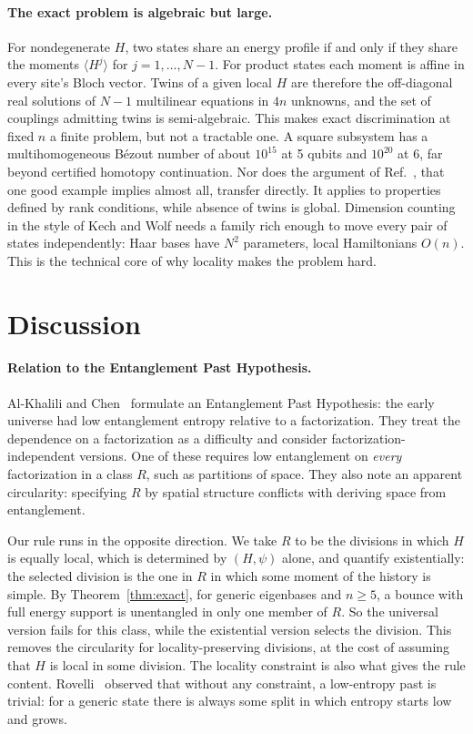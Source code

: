 \documentclass[11pt]{article}
\theoremstyle{definition}
\theoremstyle{remark}
\begin{document}
\paragraph{The exact problem is algebraic but large.} For nondegenerate $H$, two states share an energy profile if and only if they share the moments $\langle H^j\rangle$ for $j=1,\dots,N-1$. For product states each moment is affine in every site's Bloch vector. Twins of a given local $H$ are therefore the off-diagonal real solutions of $N-1$ multilinear equations in $4n$ unknowns, and the set of couplings admitting twins is semi-algebraic. This makes exact discrimination at fixed $n$ a finite problem, but not a tractable one. A square subsystem has a multihomogeneous B\'ezout number of about $10^{15}$ at 5 qubits and $10^{20}$ at 6, far beyond certified homotopy continuation. Nor does the argument of Ref.~\cite{CPR2019}, that one good example implies almost all, transfer directly. It applies to properties defined by rank conditions, while absence of twins is global. Dimension counting in the style of Kech and Wolf needs a family rich enough to move every pair of states independently: Haar bases have $N^2$ parameters, local Hamiltonians $O(n)$. This is the technical core of why locality makes the problem hard.

\section{Discussion}
\label{sec:discussion}

\paragraph{Relation to the Entanglement Past Hypothesis.} Al-Khalili and Chen~\cite{AlKhaliliChen2024} formulate an Entanglement Past Hypothesis: the early universe had low entanglement entropy relative to a factorization. They treat the dependence on a factorization as a difficulty and consider factorization-independent versions. One of these requires low entanglement on \emph{every} factorization in a class $R$, such as partitions of space. They also note an apparent circularity: specifying $R$ by spatial structure conflicts with deriving space from entanglement.

Our rule runs in the opposite direction. We take $R$ to be the divisions in which $H$ is equally local, which is determined by $(H,\psi)$ alone, and quantify existentially: the selected division is the one in $R$ in which some moment of the history is simple. By Theorem~\ref{thm:exact}, for generic eigenbases and $n\ge5$, a bounce with full energy support is unentangled in only one member of $R$. So the universal version fails for this class, while the existential version selects the division.
This removes the circularity for locality-preserving divisions, at the cost of assuming that $H$ is local in some division. The locality constraint is also what gives the rule content. Rovelli~\cite{Rovelli2014} observed that without any constraint, a low-entropy past is trivial: for a generic state there is always some split in which entropy starts low and grows.
\end{document}
